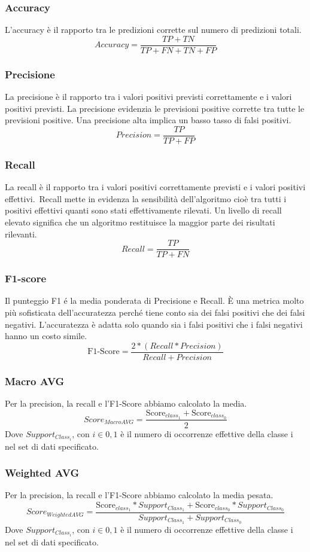 \documentclass[../../Report.tex]{subfiles}
\begin{document}
\subsubsection{Accuracy}
L'accuracy è il rapporto tra le predizioni corrette sul numero di predizioni totali.
$$Accuracy =  \frac{TP + TN}{TP + FN + TN + FP}$$
\subsubsection{Precisione}
La precisione è il rapporto tra i valori positivi previsti correttamente e i valori positivi previsti.
La precisione evidenzia le previsioni positive corrette tra tutte le previsioni positive.
Una precisione alta implica un basso tasso di falsi positivi.
$$Precision = \frac{TP}{TP + FP}$$
\subsubsection{Recall}
La recall è il rapporto tra i valori positivi correttamente previsti e i valori positivi effettivi.\
Recall mette in evidenza la sensibilità dell'algoritmo cioè tra tutti i positivi effettivi quanti sono stati effettivamente rilevati.
Un livello di recall elevato significa che un algoritmo restituisce la maggior parte dei risultati rilevanti.
$$Recall = \frac{TP}{TP + FN}$$
\subsubsection{F1-score}
Il punteggio F1 é la media ponderata di Precisione e Recall. 
È una metrica molto più sofisticata dell'accuratezza perché tiene conto sia dei falsi positivi che dei falsi negativi. L'accuratezza è adatta solo quando sia i falsi positivi che i falsi negativi hanno un costo simile. 
$$\textrm{F1-Score} = \frac{2 * (Recall * Precision )}{Recall + Precision }$$
\subsubsection{Macro AVG}
Per la precision, la recall e l'F1-Score abbiamo calcolato la media.
$$Score_{Macro AVG} = \frac{\textrm{Score}_{class_1} + \textrm{Score}_{class_0}}{2}$$
Dove $Support_{Class_i}$, con $i \in {0,1}$ è il numero di occorrenze effettive della classe i nel set di dati specificato.

\subsubsection{Weighted AVG}
Per la precision, la recall e l'F1-Score abbiamo calcolato la media pesata.
$$Score_{Weighted AVG} = \frac{\textrm{Score}_{class_1} * Support_{Class_1} + \textrm{Score}_{class_0} * Support_{Class_0}}{Support_{Class_1} + Support_{Class_0}}$$
Dove $Support_{Class_i}$, con $i \in {0,1}$ è il numero di occorrenze effettive della classe i nel set di dati specificato.
\end{document}

